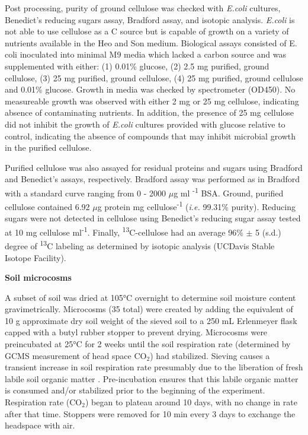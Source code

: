 Post processing, purity of ground cellulose was checked with \textit{E.coli} cultures, Benedict's reducing sugars assay, Bradford assay, and isotopic analysis. \textit{E.coli} is not able to use cellulose as a C source but is capable of growth on a variety of nutrients available in the Heo and Son medium.  Biological assays consisted of E. coli inoculated into minimal M9 media which lacked a carbon source and was supplemented with either: (1) 0.01\% glucose, (2) 2.5 mg purified, ground cellulose, (3) 25 mg purified, ground cellulose, (4) 25 mg purified, ground cellulose and 0.01\% glucose. Growth in media was checked by spectrometer (OD450). No measureable growth was observed with either 2 mg or 25 mg cellulose, indicating absence of contaminating nutrients. In addition, the presence of 25 mg cellulose did not inhibit the growth of \textit{E.coli} cultures provided with glucose relative to control, indicating the absence of compounds that may inhibit microbial growth in the purified cellulose. 

Purified cellulose was also assayed for residual proteins and sugars using Bradford and Benedict's assays, respectively. Bradford assay was performed as in Bradford \cite{Bradford_1976} with a standard curve ranging from 0 - 2000 $\mu$g ml \textsuperscript{-1} BSA. Ground, purified cellulose contained 6.92 $\mu$g protein mg cellulose\textsuperscript{-1} (\textit{i.e.} 99.31\% purity). Reducing sugars were not detected in cellulose using Benedict's reducing sugar assay \cite{benedict1909reagent} tested at 10 mg cellulose ml\textsuperscript{-1}. Finally, \textsuperscript{13}C-cellulose had an average 96\% $\pm$ 5 (s.d.) degree of \textsuperscript{13}C labeling as determined by isotopic analysis (UCDavis Stable Isotope Facility).           

\textbf{Soil microcosms}

A subset of soil was dried at 105°C overnight to determine soil moisture content gravimetrically. Microcosms (35 total) were created by adding the equivalent of 10 g approximate dry soil weight of the sieved soil to a 250 mL Erlenmeyer flask capped with a butyl rubber stopper to prevent drying. Microcosms were preincubated at 25°C for 2 weeks until the soil respiration rate (determined by GCMS measurement of head space CO$_{2}$) had stabilized. Sieving causes a transient increase in soil respiration rate presumably due to the liberation of fresh labile soil organic matter \cite{Datta_2014}. Pre-incubation ensures that this labile organic matter is consumed and/or stabilized prior to the beginning of the experiment. Respiration rate (CO$_{2}$) began to plateau around 10 days, with no change in rate after that time. Stoppers were removed for 10 min every 3 days to exchange the headspace with air. 


